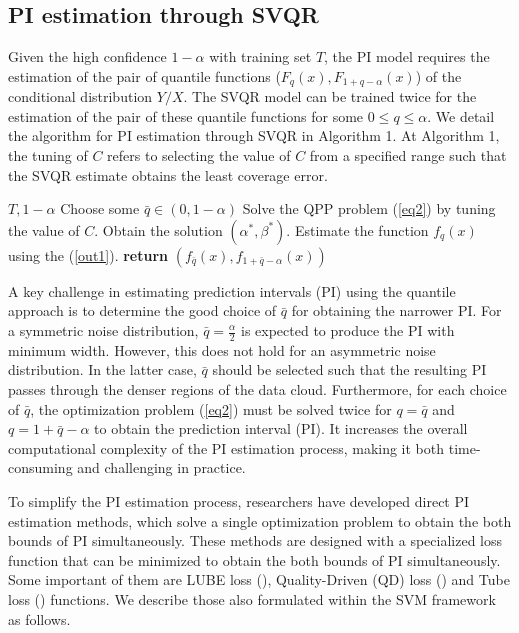 \documentclass[10pt]{article} %
\begin{document}
\subsection{PI estimation through SVQR}
Given the high confidence $1-\alpha$ with training set $T$, the PI model requires the estimation of the pair of quantile functions ($F_{q}(x),F_{1+q-\alpha}(x)$) of the  conditional distribution $Y/X$. The SVQR model can be trained twice for the estimation of the  pair of these quantile functions for some $0 \leq q \leq \alpha$.
We detail the algorithm for PI estimation through SVQR in Algorithm 1. At Algorithm 1, the tuning of $C$ refers to selecting the value of $C$ from a specified range such that the SVQR estimate obtains the least coverage error.

\begin{algorithm}
\caption{PI estimation through SVQR}\label{alg:euclid}
\begin{algorithmic}[1]
 {$T,1-\alpha$}
\State Choose some $\bar{q} \in (0,1-\alpha)$ 
\State Solve the QPP problem (\ref{eq2}) by tuning the value of $C$. Obtain the solution $(\alpha^*,\beta^*)$.
\State  Estimate the function $f_q(x)$ using the (\ref{out1}). 
\EndFor\label{euclidendwhile}
\State \textbf{return} $(f_{\bar{q}}(x),f_{1+\bar{q}-\alpha}(x))$
\EndProcedure
\end{algorithmic}
\end{algorithm}

A key challenge in estimating prediction intervals (PI) using the quantile approach is to determine the good choice of $\bar{q}$  for obtaining the narrower PI. For a symmetric noise distribution, \(\bar{q} = \frac{\alpha}{2}\) is expected to produce the PI with minimum width. However, this does not hold for an asymmetric noise distribution. In the latter case, \(\bar{q}\) should be selected such that the resulting PI passes through the denser regions of the data cloud. Furthermore, for each choice of $\bar{q}$, the optimization problem (\ref{eq2}) must be solved twice for $q = \bar{q}$ and  $q = 1 + \bar{q} - \alpha$ to obtain the prediction interval (PI). It increases the overall computational complexity of the PI estimation process, making it both time-consuming and challenging in practice.

To simplify the PI estimation process, researchers have developed direct PI estimation methods, which solve a single optimization problem to  obtain the both bounds of PI simultaneously. These methods are designed with a specialized loss function that can be minimized to obtain the both bounds of PI simultaneously.  Some important of them are LUBE loss (\cite{khosravi2010lower}), Quality-Driven (QD) loss (\cite{pearce2018high}) and Tube loss (\cite{anand2024tube}) functions. We describe those also formulated within the SVM framework as follows.
\end{document}
